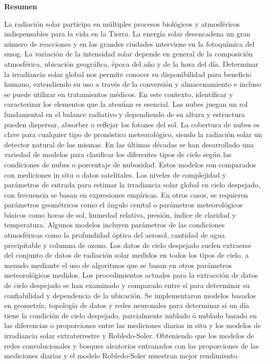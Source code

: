 \begin{center}
	\textbf{\centering \large Resumen} \vspace{0.5cm}\\
	\begin{minipage}{0.85\linewidth}
		La radiación solar participa en múltiples procesos biológicos y atmosféricos indispensables para la vida en la Tierra. La energía solar desencadena un gran número de reacciones y en las grandes ciudades interviene en la fotoquímica del smog. La variación de la intensidad solar depende en general de la composición atmosférica, ubicación geográfica, época del año y de la hora del día. Determinar la irradiancia solar global nos permite conocer su disponibilidad para beneficio humano, extendiendo su uso a través de la conversión y almacenamiento e incluso se puede utilizar en tratamientos médicos. En este contexto, identificar y caracterizar los elementos que la atenúan es esencial. Las nubes juegan un rol fundamental en el balance radiativo y dependiendo de su altura y estructura pueden dispersar, absorber o reflejar los fotones del sol. La cobertura de nubes es clave para cualquier tipo de pronóstico meteorológico, siendo la radiación solar un detector natural de las mismas. En las últimas décadas se han desarrollado una variedad de modelos para clasificar los diferentes tipos de cielo según las condiciones de nubes o porcentaje de nubosidad. Estos modelos son comparados con mediciones in situ o datos satelitales. Los niveles de complejidad y parámetros de entrada para estimar la irradiancia solar global en cielo despejado, con frecuencia se basan en expresiones empíricas. En otros casos, se requieren parámetros geométricos como el ángulo cenital o parámetros meteorológicos básicos como horas de sol, humedad relativa, presión, índice de claridad y temperatura. Algunos modelos incluyen parámetros de las condiciones atmosféricas como la profundidad óptica del aerosol, cantidad de agua precipitable y columna de ozono. Los datos de cielo despejado suelen extraerse del conjunto de datos de radiación solar medidos en todos los tipos de cielo, a menudo mediante el uso de algoritmos que se basan en otros parámetros meteorológicos medidos. Los procedimientos actuales para la extracción de datos de cielo despejado se han examinado y comparado entre sí para determinar su confiabilidad y dependencia de la ubicación. Se implementaron modelos basados en geometría, topología de datos y redes neuronales para determinar si un día tiene la condición de cielo despejado, parcialmente nublado ó nublado basado en las diferencias o proporciones entre las mediciones diarias in situ y los modelos de irradiancia solar extraterrestre y Robledo-Soler. Obteniendo que los modelos de redes convolucionales y bosques aleatorios entranados con las proporciones de las mediciones diarias y el modelo Robledo-Soler muestran mejor rendimiento.
	\end{minipage}
\end{center}
